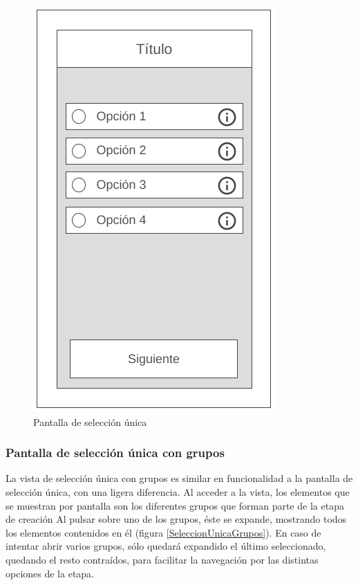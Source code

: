 \begin{figure}[H]
    \centering
    \includegraphics[scale=0.4]{Figures/Mockups/Mock_SeleccionUnica.png}
    \caption{Pantalla de selección única}
    \label{SeleccionUnica}    
\end{figure}

\subsubsection{Pantalla de selección única con grupos}
La vista de selección única con grupos es similar en funcionalidad a la pantalla de selección única, con una ligera diferencia.
Al acceder a la vista, los elementos que se muestran por pantalla son los diferentes grupos que forman parte de la etapa de creación
Al pulsar sobre uno de los grupos, éste se expande, mostrando todos los elementos contenidos en él (figura \ref*{SeleccionUnicaGrupos}). 
En caso de intentar abrir varios grupos, sólo quedará expandido el último seleccionado, quedando el resto contraídos, para facilitar la 
navegación por las distintas opciones de la etapa.

